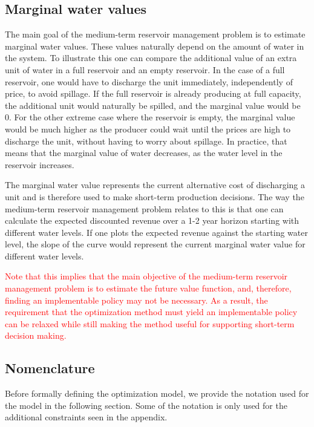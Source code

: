 \subsection*{Marginal water values}
The main goal of the medium-term reservoir management problem is to estimate marginal water values. These values naturally depend on the amount of water in the system. To illustrate this one can compare the additional value of an extra unit of water in a full reservoir and an empty reservoir. In the case of a full reservoir, one would have to discharge the unit immediately, independently of price, to avoid spillage. If the full reservoir is already producing at full capacity, the additional unit would naturally be spilled, and the marginal value would be 0. For the other extreme case where the reservoir is empty, the marginal value would be much higher as the producer could wait until the prices are high to discharge the unit, without having to worry about spillage. In practice, that means that the marginal value of water decreases, as the water level in the reservoir increases. 

The marginal water value represents the current alternative cost of discharging a unit and is therefore used to make short-term production decisions. The way the medium-term reservoir management problem relates to this is that one can calculate the expected discounted revenue over a 1-2 year horizon starting with different  water levels.  If one plots the expected revenue against the starting water level, the slope of the curve would represent the current marginal water value for different water levels. 

\textcolor{red}{Note that this implies that the main objective of the medium-term reservoir management problem is to estimate the future value function, and, therefore, finding an implementable policy may not be necessary. As a result, the requirement that the optimization method must yield an implementable policy can be relaxed while still making the method useful for supporting short-term decision making.} 


\subsection{Nomenclature}
Before formally defining the optimization model, we provide the notation used for the model in the following section. Some of the notation is only used for the additional constraints seen in the appendix. 
\label{section:notation}
